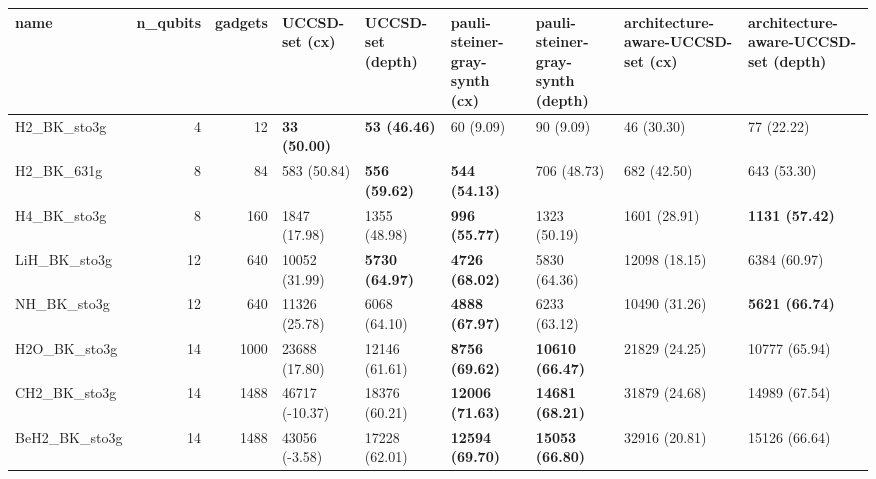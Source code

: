 \begin{tabular}{lrrllllll}
\toprule
name & n\_qubits & gadgets & UCCSD-set (cx) & UCCSD-set (depth) & pauli-steiner-gray-synth (cx) & pauli-steiner-gray-synth (depth) & architecture-aware-UCCSD-set (cx) & architecture-aware-UCCSD-set (depth) \\
\midrule
H2\_BK\_sto3g & 4 & 12 & \textbf{33 (50.00)} & \textbf{53 (46.46)} & 60 (9.09) & 90 (9.09) & 46 (30.30) & 77 (22.22) \\
H2\_BK\_631g & 8 & 84 & 583 (50.84) & \textbf{556 (59.62)} & \textbf{544 (54.13)} & 706 (48.73) & 682 (42.50) & 643 (53.30) \\
H4\_BK\_sto3g & 8 & 160 & 1847 (17.98) & 1355 (48.98) & \textbf{996 (55.77)} & 1323 (50.19) & 1601 (28.91) & \textbf{1131 (57.42)} \\
LiH\_BK\_sto3g & 12 & 640 & 10052 (31.99) & \textbf{5730 (64.97)} & \textbf{4726 (68.02)} & 5830 (64.36) & 12098 (18.15) & 6384 (60.97) \\
NH\_BK\_sto3g & 12 & 640 & 11326 (25.78) & 6068 (64.10) & \textbf{4888 (67.97)} & 6233 (63.12) & 10490 (31.26) & \textbf{5621 (66.74)} \\
H2O\_BK\_sto3g & 14 & 1000 & 23688 (17.80) & 12146 (61.61) & \textbf{8756 (69.62)} & \textbf{10610 (66.47)} & 21829 (24.25) & 10777 (65.94) \\
CH2\_BK\_sto3g & 14 & 1488 & 46717 (-10.37) & 18376 (60.21) & \textbf{12006 (71.63)} & \textbf{14681 (68.21)} & 31879 (24.68) & 14989 (67.54) \\
BeH2\_BK\_sto3g & 14 & 1488 & 43056 (-3.58) & 17228 (62.01) & \textbf{12594 (69.70)} & \textbf{15053 (66.80)} & 32916 (20.81) & 15126 (66.64) \\
\bottomrule
\end{tabular}
